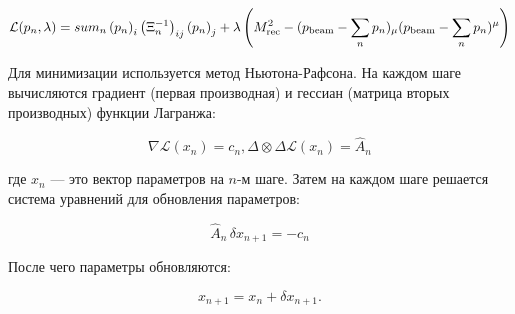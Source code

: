 \begin{equation}
    \mathcal{L}(p_n, \lambda) = 
    sum_n \left( p_{n} \right)_i  \left( \Xi_n^{-1} \right)_{ij}  \left( p_{n} \right)_j + 
    \lambda \left( M_{\text{rec}}^2 - (p_{\text{beam}} - \sum_n p_n)_\mu (p_{\text{beam}} - \sum_n p_n)^\mu \right)
\end{equation}

Для минимизации используется метод Ньютона-Рафсона. На каждом шаге вычисляются градиент (первая производная) и гессиан (матрица вторых производных) функции Лагранжа:

\begin{equation}
    \nabla \mathcal{L}(x_n) = c_n, \Delta \otimes \Delta \mathcal{L}(x_n)  = \hat{A}_n
\end{equation}

где $x_n$ — это вектор параметров на $n$-м шаге. Затем на каждом шаге решается система уравнений для обновления параметров:

\begin{equation}
    \hat{A}_n \, \delta x_{n+1} = -c_n
\end{equation}

После чего параметры обновляются:

\begin{equation}
    x_{n+1} = x_n + \delta x_{n+1}.
\end{equation}

